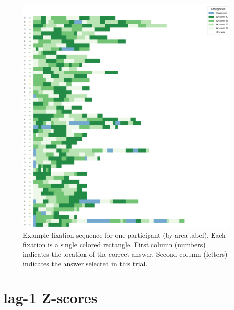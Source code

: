 \documentclass[manuscript,review,anonymous]{acmart}
\begin{document}
    \begin{figure}[H]
      \centering
      \includegraphics[width=1\textwidth]{plots/random_p_by_lbl.png}
      \caption{Example fixation sequence for one participant (by area label). Each fixation is a single colored rectangle. First column (numbers) indicates the location of the correct answer. Second column (letters) indicates the answer selected in this trial.}
      \label{fig:fixseq2}
    \end{figure}

    \section{lag-1 Z-scores}
\end{document}
